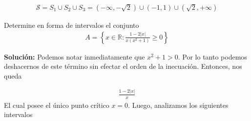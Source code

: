 \documentclass[12pt]{book}
\begin{document}
\begin{align*}
    \mathcal{S}=S_1 \cup S_2 \cup S_3 = (-\infty,-\sqrt{2}) \cup (-1,1) \cup (\sqrt{2},+\infty)
\end{align*}

\begin{prob}{}{}
    Determine en forma de intervalos el conjunto
    \begin{align*}
        A = \left\{ x \in \mathbb{R} : \frac{1-2|x|}{x(x^2+1)} \geq 0 \right\}
    \end{align*}
\end{prob}
\textbf{Solución:} Podemos notar inmediatamente que $x^2+1>0$. Por lo tanto podemos deshacernos de este término sin efectar el orden de la inecuación. Entonces, nos queda 

\begin{align*}
    \frac{1-2|x|}{x}
\end{align*}
El cual posee el único punto crítico $x=0$. Luego, analizamos los siguientes intervalos
\end{document}
